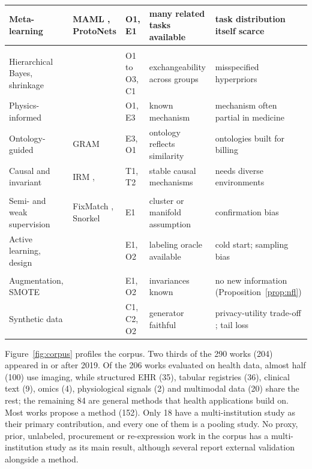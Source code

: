 \documentclass[acmsmall,screen,review]{acmart}
\theoremstyle{acmdefinition}
\begin{document}
\begin{table}[t]
\begin{tabularx}{\linewidth}{@{}>{\raggedright\arraybackslash}p{2cm}>{\raggedright\arraybackslash}p{3.3cm}>{\raggedright\arraybackslash}p{0.95cm}>{\raggedright\arraybackslash}X>{\raggedright\arraybackslash}X@{}}
Meta-learning & MAML \cite{finn2017model}, ProtoNets \cite{snell2017prototypical} & O1, E1 & many related tasks available & task distribution itself scarce\\
\midrule
\multicolumn{5}{@{}l}{\emph{P3 Prior}}\\
Hierarchical Bayes, shrinkage & \cite{efron1973steins,gelman2013bayesian} & O1 to O3, C1 & exchangeability across groups & misspecified hyperpriors\\
Physics-informed & \cite{karniadakis2021physics,raissi2019physics} & O1, E3 & known mechanism & mechanism often partial in medicine\\
Ontology-guided & GRAM \cite{choi2017gram} & E3, O1 & ontology reflects similarity & ontologies built for billing\\
Causal and invariant & IRM \cite{arjovsky2019invariant}, \cite{castro2020causality} & T1, T2 & stable causal mechanisms & needs diverse environments\\
\midrule
\multicolumn{5}{@{}l}{\emph{P4 Unlabeled, P5 Procurement}}\\
Semi- and weak supervision & FixMatch \cite{sohn2020fixmatch}, Snorkel \cite{ratner2017snorkel} & E1 & cluster or manifold assumption & confirmation bias\\
Active learning, design & \cite{budd2021survey,riley2020calculating,settles2009active} & E1, O2 & labeling oracle available & cold start; sampling bias\\
\midrule
\multicolumn{5}{@{}l}{\emph{P6 Re-expression}}\\
Augmentation, SMOTE & \cite{chawla2002smote,shorten2019survey} & E1, O2 & invariances known & no new information (Proposition~\ref{prop:nfl})\\
Synthetic data & \cite{fridadar2018gan,jordon2019pate,xu2019modeling} & C1, C2, O2 & generator faithful & privacy-utility trade-off \cite{stadler2022synthetic}; tail loss \cite{shumailov2024ai}\\
\bottomrule
\end{tabularx}
\end{table}

Figure~\ref{fig:corpus} profiles the corpus. Two thirds of the 290 works (204) appeared in or after 2019. Of the 206 works evaluated on health data, almost half (100) use imaging, while structured EHR (35), tabular registries (36), clinical text (9), omics (4), physiological signals (2) and multimodal data (20) share the rest; the remaining 84 are general methods that health applications build on. Most works propose a method (152). Only 18 have a multi-institution study as their primary contribution, and every one of them is a pooling study. No proxy, prior, unlabeled, procurement or re-expression work in the corpus has a multi-institution study as its main result, although several report external validation alongside a method.
\end{document}
